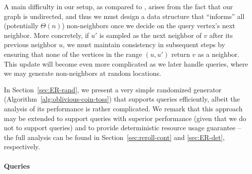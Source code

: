 A main difficulty in our setup, as compared to \cite{reut}, arises from the fact that our graph is undirected, and thus
we must design a data structure that ``informs'' all (potentially $\Theta(n)$) non-neighbors once we decide on the query vertex's next neighbor.
More concretely, if $u'$ is sampled as the next neighbor of $v$ after its previous neighbor $u$,
we must maintain consistency in subsequent steps by ensuring that none of the vertices in the range $(u,u')$ return $v$ as a neighbor.
This update will become even more complicated as we later handle  queries, where we may generate non-neighbors at random locations.

In Section~\ref{sec:ER-rand}, we present a very simple randomized generator (Algorithm~\ref{alg:oblivious-coin-toss})
that supports  queries efficiently, albeit the analysis of its performance is rather complicated.
We remark that this approach may be extended to support  queries with superior performance
(given that we do not to support  queries) and to provide deterministic resource usage guarantee
-- the full analysis can be found in Section~\ref{sec:reroll-cont} and \ref{sec:ER-det}, respectively.

\paragraph*{ Queries}
\label{par:random_neighbor_queries}

